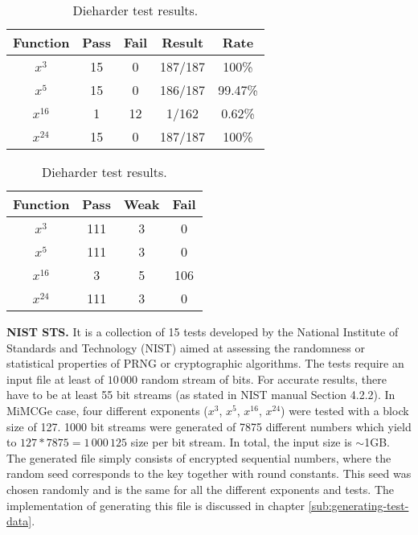 \documentclass{Resources/UoBLab1}
\theoremstyle{definition}
\begin{document}
\begin{table}[]
    \begin{minipage}{.5\textwidth}
        \centering
        \begin{tabular}{|c|c|c|c|c|}
            \hline
            Function & Pass & Fail & Result & Rate \\
            \hline
            $x^3$ & 15 & 0 & 187/187 & 100\% \\
            $x^5$ & 15 & 0 & 186/187 & 99.47\% \\
            $x^{16}$ & 1 & 12 & 1/162 & 0.62\% \\
            $x^{24}$ & 15 & 0 & 187/187 & 100\% \\
            \hline
        \end{tabular}
        \caption{NIST test results.}\label{tab:NIST-results}
    \end{minipage}%
    \begin{minipage}{.5\textwidth}
        \centering
        \begin{tabular}{|c|c|c|c|}
            \hline
            Function & Pass & Weak & Fail \\
            \hline
            $x^3$ & 111 & 3 & 0 \\
            $x^5$ & 111 & 3 & 0 \\
            $x^{16}$ & 3 & 5 & 106 \\
            $x^{24}$ & 111 & 3 & 0 \\
            \hline
        \end{tabular}
        \caption{Dieharder test results.}\label{tab:dieharder-results}
    \end{minipage}
\end{table}

\noindent\textbf{NIST STS.} It is a collection of 15 tests developed by the National Institute of Standards and Technology (NIST) aimed at assessing the randomness or statistical properties of PRNG or cryptographic algorithms. The tests require an input file at least of $10\,000$ random stream of bits. For accurate results, there have to be at least 55 bit streams (as stated in NIST manual Section 4.2.2\cite{NIST}). In MiMCGe case, four different exponents ($x^3$, $x^5$, $x^{16}$, $x^{24}$) were tested with a block size of 127. 1000 bit streams were generated of 7875 different numbers which yield to $127 * 7875 = 1\,000\,125$ size per bit stream. In total, the input size is $\sim$1GB. The generated file simply consists of encrypted sequential numbers, where the random seed corresponds to the key together with round constants. This seed was chosen randomly and is the same for all the different exponents and tests. The implementation of generating this file is discussed in chapter \ref{sub:generating-test-data}.
\end{document}
